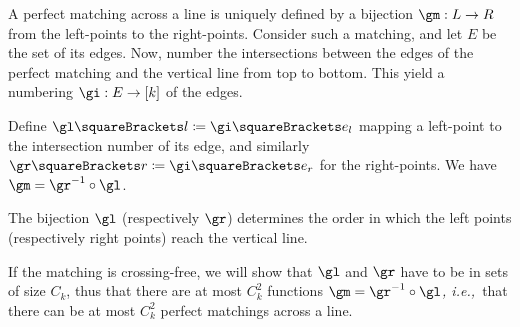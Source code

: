 \documentclass[10pt, a4paper, twoside]{basestyle}
\newcommand{\idest}{\emph{, i.e.,\ }}
\begin{document}
A perfect matching across a line is uniquely defined by a bijection $\FunctionSpec \gm L R$ from
the left-points to the right-points. Consider such a matching, and let $E$ be the set of its edges.
Now, number the intersections between the edges of the perfect matching and the vertical
line from top to bottom. This yield a numbering $\FunctionSpec \gi E {[k]}$ of the edges.

Define $\gl\of l \DefineAs \gi\of{e_l}$ mapping a left-point to the intersection number of its
edge, and similarly $\gr\of r \DefineAs \gi\of{e_r}$ for the right-points. We have
$\gm = \gr^{-1} \Compose \gl$.

The bijection $\gl$ (respectively $\gr$) determines the order in which the left points (respectively right points)
reach the vertical line.

If the matching is crossing-free, we will show that
$\gl$ and $\gr$ have to be in sets of size $C_k$, thus that there are at most $C_k^2$ functions
$\gm = \gr^{-1} \Compose \gl$\idest that there can be at most $C_k^2$ perfect matchings across a line.
\end{document}
